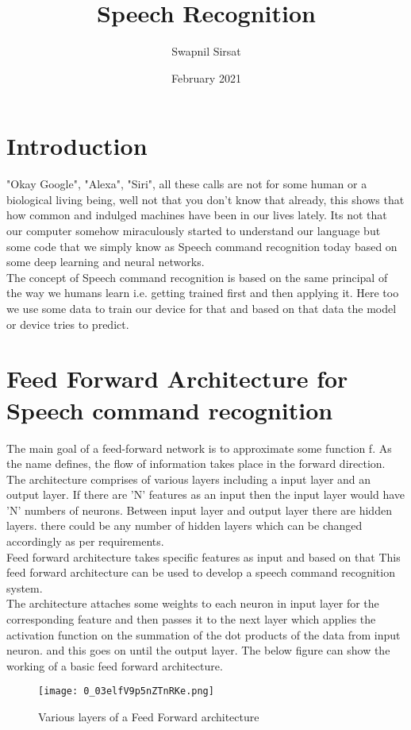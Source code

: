 \documentclass{article}
\title{Speech Recognition}
\author{Swapnil Sirsat}
\date{February 2021}
\begin{document}
\maketitle
\section*{Introduction}
"Okay Google", "Alexa", "Siri", all these calls are not for some human or a biological living being, well not that you don't know that already, this shows that how common and indulged machines have been in our lives lately. Its not that our computer somehow miraculously started to understand our language but some code that we simply know as Speech command recognition today based on some deep learning and neural networks.\\
    The concept of Speech command recognition is based on the same principal of the way we
humans learn i.e. getting trained first and then applying it. Here too we use some data to train our device for that and based on that data the model or device tries to predict.

\section*{Feed Forward Architecture for Speech command recognition}
The main goal of a feed-forward network is to approximate some function f.
As the name defines, the flow of information takes place in the forward direction.
The architecture comprises of various layers including a input layer and an output layer. If there are 'N' features as an input then the input layer would have 'N' numbers of neurons. Between input layer and output layer there are hidden layers.
there could be any number of hidden layers which can be changed accordingly as per requirements.\\
Feed forward architecture takes specific features as input and based on that 
This feed forward architecture can be used to develop a speech command recognition system.
\\ The architecture attaches some weights to each neuron in input layer for the corresponding feature and then passes it to the next layer which applies the activation function on the summation of the dot products of the data from input neuron. and this goes on until the output layer.
The below figure can show the working of a basic feed forward architecture.
\begin{figure}[h!]
    \centering
    \texttt{[image: 0\_03elfV9p5nZTnRKe.png]}
    \caption{Various layers of a Feed Forward architecture}
    \label{fig:my_label}
\end{figure}
\end{document}
